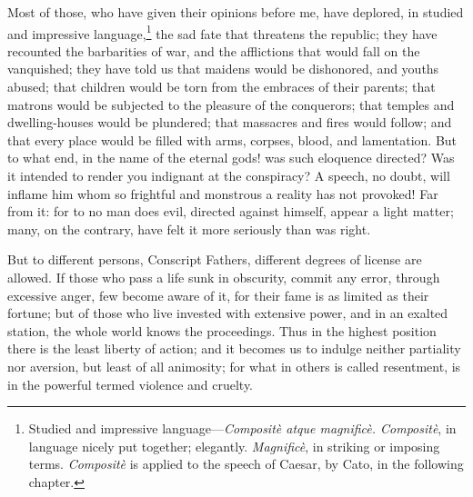 Most of those, who have given their opinions before me, have
deplored, in studied and impressive language,\footnote{Studied and impressive language—\emph{Compositè atque magnificè.
Compositè}, in language nicely put together; elegantly. \emph{Magnificè},
in striking or imposing terms. \emph{Compositè} is applied to the speech
of Caesar, by Cato, in the following chapter.} the sad fate that
threatens the republic; they have recounted the barbarities of war,
and the afflictions that would fall on the vanquished; they have told
us that maidens would be dishonored, and youths abused; that children
would be torn from the embraces of their parents; that matrons would
be subjected to the pleasure of the conquerors; that temples and
dwelling-houses would be plundered; that massacres and fires would
follow; and that every place would be filled with arms, corpses,
blood, and lamentation. But to what end, in the name of the eternal
gods! was such eloquence directed? Was it intended to render you
indignant at the conspiracy? A speech, no doubt, will inflame him whom
so frightful and monstrous a reality has not provoked! Far from it:
for to no man does evil, directed against himself, appear a light
matter; many, on the contrary, have felt it more seriously than was
right.

But to different persons, Conscript Fathers, different degrees of
license are allowed. If those who pass a life sunk in obscurity,
commit any error, through excessive anger, few become aware of it, for
their fame is as limited as their fortune; but of those who live
invested with extensive power, and in an exalted station, the whole
world knows the proceedings. Thus in the highest position there is the
least liberty of action; and it becomes us to indulge neither
partiality nor aversion, but least of all animosity; for what in
others is called resentment, is in the powerful termed violence and
cruelty.


